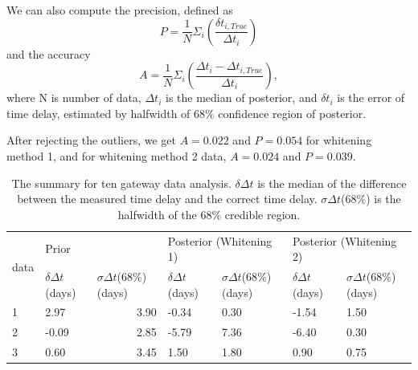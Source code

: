 \documentclass[\docopts]{\docclass}
\begin{document}
We can also compute the precision, defined as 
\begin{equation}
P=\frac{1}{N} \Sigma_i (\frac{\delta t_{i, True}}{\Delta t_i})
\end{equation}
and the accuracy
\begin{equation}
A = \frac{1}{N} \Sigma_i (\frac{\Delta t_i-\Delta t_{i, True}}{\Delta t_i}),
\end{equation}
where N is number of data, $\Delta t_i$ is the median of posterior, and $\delta t_i$ is the error of time delay, estimated by halfwidth of $68\%$ confidence region of posterior.  

After rejecting the outliers, we get $A=0.022$ and $P=0.054$ for whitening method 1, and for whitening method 2 data, $A=0.024$ and $P=0.039$. 


\begin{table}[ht!]
\centering
\caption{The summary for ten gateway data analysis. $\delta \Delta t$ is the median of the difference between the measured time delay and the correct time delay. $\sigma\Delta t$($68\%$) is the halfwidth of the $68\%$ credible region.}
\label{tab:summary}
\begin{tabular}{|l|l|r|l|l|l|l|}
\hline
\multicolumn{1}{|c|}{\multirow{2}{*}{data}} & \multicolumn{2}{l|}{Prior}                                                    & \multicolumn{2}{l|}{Posterior (Whitening 1)}              & \multicolumn{2}{l|}{Posterior (Whitening 2)}              \\ \cline{2-7} 
\multicolumn{1}{|c|}{}                      & $\delta\Delta t$(days) & \multicolumn{1}{l|}{$\sigma\Delta t$(68$\%$) (days)} & $\delta\Delta t$ (days) & $\sigma\Delta t$(68$\%$) (days) & $\delta\Delta t$ (days) & $\sigma\Delta t$(68$\%$) (days) \\ \hline
1                                           & 2.97                   & 3.90                                                 & -0.34                   & 0.30                            & -1.54                   & 1.50                            \\ \hline
2                                           & -0.09                  & 2.85                                                 & -5.79                   & 7.36                            & -6.40                   & 0.30                            \\ \hline
3                                           & 0.60                   & 3.45                                                 & 1.50                    & 1.80                            & 0.90                    & 0.75                            \\ \hline

\end{tabular}
\end{table}
\end{document}
